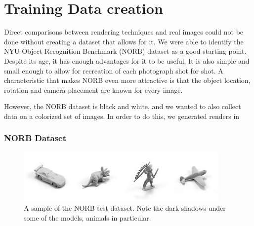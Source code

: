\documentclass[10pt,twocolumn,letterpaper]{article}
\begin{document}
\section{Training Data creation}
Direct comparisons between rendering techniques and real images could not be done without creating a dataset that allows for it.  We were able to identify the NYU Object Recognition Benchmark (NORB) dataset \cite{LeCun:2004:LMG:1896300.1896315} as a good starting point. Despite its age, it has enough advantages for it to be useful.  It is also simple and small enough to allow for recreation of each photograph shot for shot.  A characteristic that makes NORB even more attractive is that the object location, rotation and camera placement are known for every image.

However, the NORB dataset is black and white, and we wanted to also collect data on a colorized set of images. In order to do this, we generated renders in
\subsubsection{NORB Dataset}

\begin{figure}[h!]
\centering
\includegraphics[width=1.0\columnwidth]{./assets/NORBTestSmall.png}
\caption{A sample of the NORB test dataset. Note the dark shadows under some of the models, animals in particular.}
\label{fig:norb-samples}
\end{figure}
\end{document}
